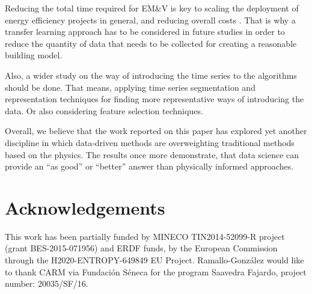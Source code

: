 \documentclass[10pt, conference, compsocconf]{IEEEtran}
\begin{document}
Reducing the total time required for EM\&V is key to scaling the deployment of energy efficiency projects in general, and reducing overall costs \cite{granderson2015automated}. That is why a transfer learning approach has to be considered in future studies in order to reduce the quantity of data that needs to be collected for creating a reasonable building model.

Also, a wider study on the way of introducing the time series to the algorithms should be done. That means, applying time series segmentation and representation techniques for finding more representative ways of introducing the data. Or also considering feature selection techniques.


Overall, we believe that the work reported on this paper has explored yet another discipline in which data-driven methods are overweighting traditional methods based on the physics. The results once more demonstrate, that data science can provide an “as good” or “better” answer than physically informed approaches.

\section*{Acknowledgements}

This work has been partially funded by MINECO TIN2014-52099-R project (grant BES-2015-071956) and ERDF funds, by the European Commission through the H2020-ENTROPY-649849 EU Project. Ramallo-González would like to thank CARM via Fundación Séneca for the program Saavedra Fajardo, project number: 20035/SF/16.


%
%
\end{document}
